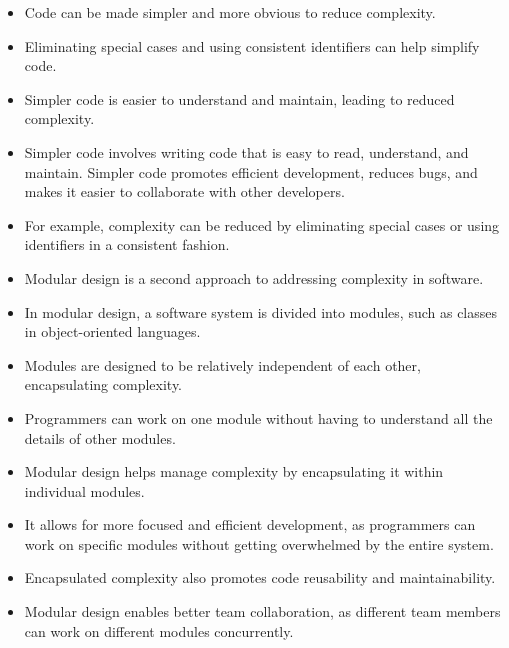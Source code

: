 { 
	
	
	\begin{itemize}
		\item Code can be made simpler and more obvious to reduce complexity.
		
    	\item	Eliminating special cases and using consistent identifiers can help simplify code.
		
		
        \item Simpler code is easier to understand and maintain, leading to reduced complexity.
		
		\item	Simpler  code involves writing code that is easy to read, understand, and maintain. Simpler code promotes efficient development, reduces bugs, and makes it easier to collaborate with other developers.
		
		\item	For example, complexity can be reduced by eliminating special cases or using identifiers in a consistent fashion.
			
	\end{itemize}
}

\medskip

{ 
	
	
	\begin{itemize}
		\item Modular design is a second approach to addressing complexity in software.
		\item In modular design, a software system is divided into modules, such as classes in object-oriented languages.
		\item Modules are designed to be relatively independent of each other, encapsulating complexity.
    	\item Programmers can work on one module without having to understand all the details of other modules.
		
	\end{itemize}
}

\medskip

{ 
	
	
	\begin{itemize}
		\item Modular design helps manage complexity by encapsulating it within individual modules.
		
		\item	It allows for more focused and efficient development, as programmers can work on specific modules without getting overwhelmed by the entire system.
		
		\item	Encapsulated complexity also promotes code reusability and maintainability.
		
		\item	Modular design enables better team collaboration, as different team members can work on different modules concurrently.
		
		
	\end{itemize}
}


